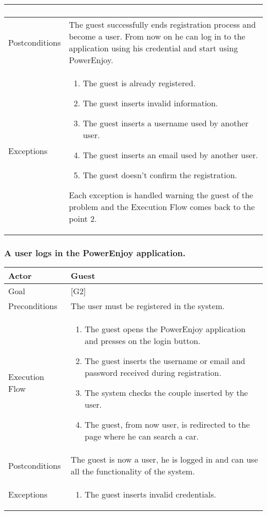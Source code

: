 \documentclass{article}
\begin{document}
\begin{tabularx}{\textwidth}{  l  X  }
\begin{enumerate}
						 \end{enumerate}\\
		\hline
		Postconditions & The guest successfully ends registration process and become a user. From now on he can log in to the application using his credential and start using PowerEnjoy.\\
		\hline
		Exceptions & \begin{enumerate}
			 \item{The guest is already registered.}
					 			 \item{The guest inserts invalid information.}
					 		   \item{The guest inserts a username used by another user.}
					 		   \item{The guest inserts an email used by another user.}
					 		 	 \item{The guest doesn't confirm the registration.}
					 		 \end{enumerate}
					 Each exception is handled warning the guest of the problem and the Execution Flow comes back to the point 2.\\
		\hline
	\end{tabularx}

	\subsubsection{A user logs in the PowerEnjoy application.}
	\begin{tabularx}{\textwidth}{  l  X  }
		\hline
		Actor & Guest\\
		\hline
		Goal & [G2]\\
		\hline
		Preconditions & The user must be registered in the system.\\
		\hline
		Execution Flow & \begin{enumerate}
			               \item{The guest opens the PowerEnjoy application and presses on the login button.}
										 \item{The guest inserts the username or email and password received during registration.}
										 \item{The system checks the couple inserted by the user.}
										 \item{The guest, from now user, is redirected to the page where he can search a car.}
										\end{enumerate}\\
		\hline
		Postconditions & The guest is now a user, he is logged in and can use all the functionality of the system.\\
		\hline
		Exceptions & \begin{enumerate}
			\item{The guest inserts invalid credentials.}
			\end{enumerate}\\
		\hline
	\end{tabularx}
\end{document}

